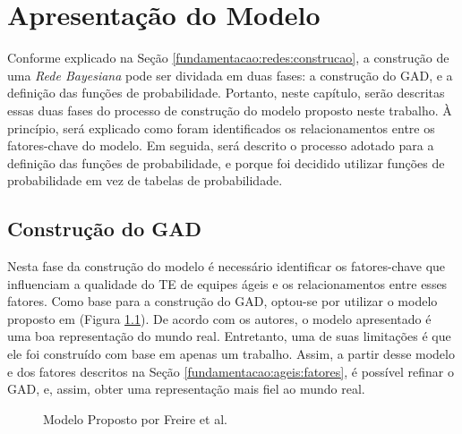 \chapter{Apresentação do Modelo}
\label{modelo}

Conforme explicado na Seção \ref{fundamentacao:redes:construcao}, a construção de uma \textit{Rede Bayesiana} pode ser dividada em duas fases: a construção do GAD, e a definição das funções de probabilidade. Portanto, neste capítulo, serão descritas essas duas fases do processo de construção do modelo proposto neste trabalho. À princípio, será explicado como foram identificados os relacionamentos entre os fatores-chave do modelo. Em seguida, será descrito o processo adotado para a definição das funções de probabilidade, e porque foi decidido utilizar funções de probabilidade em vez de tabelas de probabilidade.

\section{Construção do GAD}
\label{modelo:gad}

Nesta fase da construção do modelo é necessário identificar os fatores-chave que influenciam a qualidade do TE de equipes ágeis e os relacionamentos entre esses fatores. Como base para a construção do GAD, optou-se por utilizar o modelo proposto em \cite{freire} (Figura \ref{modelo:gad:freire}). De acordo com os autores, o modelo apresentado é uma boa representação do mundo real. Entretanto, uma de suas limitações é que ele foi construído com base em apenas um trabalho. Assim, a partir desse modelo e dos fatores descritos na Seção \ref{fundamentacao:ageis:fatores}, é possível refinar o GAD, e, assim, obter uma representação mais fiel ao mundo real.

\begin{figure}[ht!]	
\begin{center}
	\end{center}
	\caption{Modelo Proposto por Freire et al.}
	\label{modelo:gad:freire}
\end{figure}

